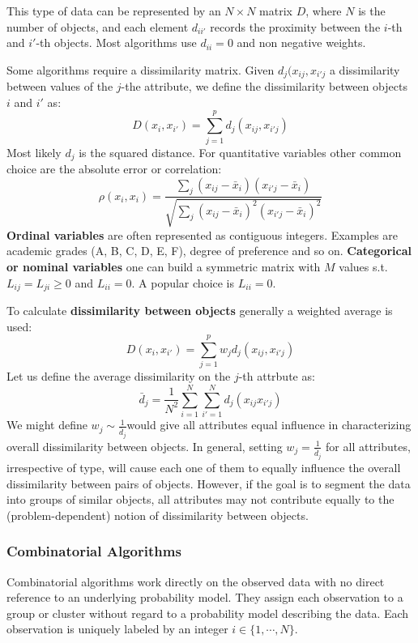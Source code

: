 \documentclass[12pt, letterpaper]{article}
\theoremstyle{definition}
\begin{document}
This type of data can be represented by an $N \times N$ matrix $D$, where $N$ is the number of objects, and each element $d_{ii'}$ records the proximity between the $i$-th and $i'$-th objects. Most algorithms use $d_{ii}= 0$ and non negative weights.

Some algorithms require a dissimilarity matrix. Given $d_j(x_{ij}, x_{i'j}$ a dissimilarity between values of the $j$-the attribute, we define the dissimilarity between objects $i$ and $i'$ as:
\begin{equation}
D(x_i, x_{i'}) = \sum_{j=1}^p d_j (x_{ij}, x_{i'j})
\end{equation}
Most likely $d_j$ is the squared distance. For quantitative variables other common choice are the absolute error or correlation:
\begin{equation}
\rho(x_i, x_{i}) = \frac{\sum_j (x_{ij} - \bar{x}_i)(x_{i'j} - \bar{x}_i)}{\sqrt{\sum_j (x_{ij} - \bar{x}_i)^2(x_{i'j} - \bar{x}_i)^2}}
\end{equation}
\textbf{Ordinal variables} are often represented as contiguous integers. Examples are academic grades (A, B, C, D, E, F), degree of preference and so on. 
\textbf{Categorical or nominal variables} one can build a symmetric matrix with $M$ values s.t. $L_{ij}=L_{ji}\ge 0$ and $L_{ii}=0$. A popular choice is $L_{ii} = 0$.

To calculate \textbf{dissimilarity between objects} generally a weighted average is used:
\begin{equation}
D(x_i, x_{i'}) = \sum_{j=1}^p w_j d_j (x_{ij}, x_{i'j})
\end{equation}
Let us define the average dissimilarity on the $j$-th attrbute as:
\begin{equation}
\bar{d}_j = \frac{1}{N^2}\sum_{i=1}^N\sum_{i'=1}^N d_j(x_{ij}x_{i'j})
\end{equation}
We might define $w_j \sim \frac{1}{\bar{d}_j}$would give all attributes equal influence in characterizing overall dissimilarity between objects. In general, setting $w_j = \frac{1}{\bar{d}_j}$ for all attributes, irrespective of type, 
will cause each one of them to equally influence the overall dissimilarity between pairs of objects. However, if the goal is to segment the data into groups of similar objects, all attributes may not contribute equally to the (problem-dependent) notion of dissimilarity between objects.

\subsubsection{Combinatorial Algorithms}
Combinatorial algorithms work directly on the observed data with no direct reference to an underlying probability model. They assign each observation to a group or cluster without regard to a probability model describing the data. Each observation is uniquely labeled by an integer $i \in \{1,\cdots, N\}$.
\end{document}
